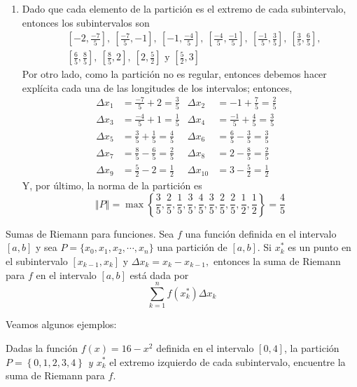 \begin{enumerate}[leftmargin=1.2em,   itemindent=0pt,       labelwidth=\labelwidth,
	labelsep=0.5em,]
\item Dado que cada elemento de la partición es el extremo de cada subintervalo, entonces los subintervalos son
\begin{align*}
&\left[ -2,\frac{-7}{5}\right],\ \left[ \frac{-7}{5},-1\right],\
\left[ -1,\frac{-4}{5}\right],\ \left[
\frac{-4}{5},\frac{-1}{5}\right],\ \left[
\frac{-1}{5},\frac{3}{5}\right],\
\left[\frac{3}{5},\frac{6}{5}\right],\\
&\left[ \frac{6}{5},\frac{8}{5}\right],\ \left[
\frac{8}{5},2\right],\ \left[ 2,\frac{5}{2}\right]\text{ y }
\left[ \frac{5}{2},3\right]
\end{align*}
Por otro lado, como la partición no es regular, entonces debemos
hacer explícita cada una de las longitudes de los intervalos;
entonces,
\begin{align*}
\Delta x_{1}&=\frac{-7}{5}+2=\frac{3}{5} & \Delta x_{2}&=-1+\frac{7}{5}=\frac{2}{5}\\
\Delta x_{3}&=\frac{-4}{5}+1=\frac{1}{5} & \Delta
x_{4}&=\frac{-1}{5}+
\frac{4}{5}=\frac{3}{5}\\
\Delta x_{5}&=\frac{3}{5}+\frac{1}{5}=\frac{4}{5} &\Delta x_{6}&=\frac{6}{5}-\frac{3}{5}=\frac{3}{5}\\
\Delta x_{7}&=\frac{8}{5}-\frac{6}{5}=\frac{2}{5}& \Delta x_{8}&=2-\frac{8}{5}=\frac{2}{5}&\\
\Delta x_{9}&=\frac{5}{2}-2=\frac{1}{2}& \Delta
x_{10}&=3-\frac{5}{2}=\frac{1}{2}
\end{align*}
Y, por último, la norma de la partición es
\[
\left\Vert P\right\Vert=\max \left\{ \frac{3}{5},\frac{2}{5},\frac{1}{5},\frac{3}{5},%
\frac{4}{5},\frac{3}{5},\frac{2}{5},\frac{2}{5},\frac{1}{2},\frac{1}{2}\right\}
=\frac{4}{5} 
\]

\end{enumerate}

\begin{defi} 
\textnormal{Sumas de Riemann para funciones. Sea \textit{$f$} una función definida en el intervalo \textit{$\left[ a,b\right] $} y sea \textit{$P=\{x_{0},x_{1},x_{2},\cdots ,x_{n}\}$} una partición de \textit{$\left[ a,b\right] $}. Si \textit{$x_{k}^{\ast }$} es un punto en el subintervalo \textit{$\left[ x_{k-1},x_{k}\right] $} y \textit{$\Delta x_{k}=x_{k}-x_{k-1},$} entonces la suma de Riemann para \textit{$f$} en el intervalo \textit{$\left[ a,b\right] $} está dada por}
\[
\sum_{k=1}^{n}f(x_{k}^{\ast })\Delta x_{k}
\]
\end{defi}
Veamos algunos ejemplos:

\begin{ejemplo}
\textnormal{Dadas la función \textit{$f(x)=16-x^{2}$} definida en el intervalo $\left[ 0,4\right]$, la partición \textit{$P=\left\{ 0,1,2,3,4\right\} $ y $x_{k}^{\ast }$} el extremo izquierdo de cada subintervalo, encuentre la suma de Riemann para \textit{$f$}.}
\end{ejemplo}

